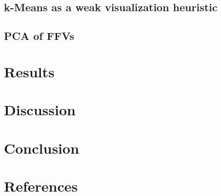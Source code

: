 \documentclass{article}
\begin{document}
\subsection{k-Means as a weak visualization heuristic}

\subsection{PCA of FFVs}

\newpage
\section{Results}

\newpage
\section{Discussion}

\newpage
\section{Conclusion}

\newpage
\section{References}

\end{document}

